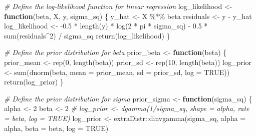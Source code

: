 \documentclass[
  letterpaper,
]{krantz}
\newenvironment{Shaded}{}{}
\newcommand{\AttributeTok}[1]{\textcolor[rgb]{0.49,0.56,0.16}{#1}}
\newcommand{\CommentTok}[1]{\textcolor[rgb]{0.38,0.63,0.69}{\textit{#1}}}
\newcommand{\ConstantTok}[1]{\textcolor[rgb]{0.53,0.00,0.00}{#1}}
\newcommand{\ControlFlowTok}[1]{\textcolor[rgb]{0.00,0.44,0.13}{\textbf{#1}}}
\newcommand{\DecValTok}[1]{\textcolor[rgb]{0.25,0.63,0.44}{#1}}
\newcommand{\FloatTok}[1]{\textcolor[rgb]{0.25,0.63,0.44}{#1}}
\newcommand{\FunctionTok}[1]{\textcolor[rgb]{0.02,0.16,0.49}{#1}}
\newcommand{\NormalTok}[1]{#1}
\newcommand{\OtherTok}[1]{\textcolor[rgb]{0.00,0.44,0.13}{#1}}
\newcommand{\SpecialCharTok}[1]{\textcolor[rgb]{0.25,0.44,0.63}{#1}}
\begin{document}
\begin{Shaded}
\begin{Highlighting}[]
\CommentTok{\# Define the log{-}likelihood function for linear regression}
\NormalTok{log\_likelihood }\OtherTok{\textless{}{-}} \ControlFlowTok{function}\NormalTok{(beta, X, y, sigma\_sq) \{}
\NormalTok{    y\_hat }\OtherTok{\textless{}{-}}\NormalTok{ X }\SpecialCharTok{\%*\%}\NormalTok{ beta}
\NormalTok{    residuals }\OtherTok{\textless{}{-}}\NormalTok{ y }\SpecialCharTok{{-}}\NormalTok{ y\_hat}
\NormalTok{    log\_likelihood }\OtherTok{\textless{}{-}} \SpecialCharTok{{-}}\FloatTok{0.5} \SpecialCharTok{*} \FunctionTok{length}\NormalTok{(y) }\SpecialCharTok{*} \FunctionTok{log}\NormalTok{(}\DecValTok{2} \SpecialCharTok{*}\NormalTok{ pi }\SpecialCharTok{*}\NormalTok{ sigma\_sq) }\SpecialCharTok{{-}} \FloatTok{0.5} \SpecialCharTok{*} \FunctionTok{sum}\NormalTok{(residuals}\SpecialCharTok{\^{}}\DecValTok{2}\NormalTok{) }\SpecialCharTok{/}\NormalTok{ sigma\_sq}
    \FunctionTok{return}\NormalTok{(log\_likelihood)}
\NormalTok{\}}

\CommentTok{\# Define the prior distribution for beta}
\NormalTok{prior\_beta }\OtherTok{\textless{}{-}} \ControlFlowTok{function}\NormalTok{(beta) \{}
\NormalTok{    prior\_mean }\OtherTok{\textless{}{-}} \FunctionTok{rep}\NormalTok{(}\DecValTok{0}\NormalTok{, }\FunctionTok{length}\NormalTok{(beta))}
\NormalTok{    prior\_sd }\OtherTok{\textless{}{-}} \FunctionTok{rep}\NormalTok{(}\DecValTok{10}\NormalTok{, }\FunctionTok{length}\NormalTok{(beta))}
\NormalTok{    log\_prior }\OtherTok{\textless{}{-}} \FunctionTok{sum}\NormalTok{(}\FunctionTok{dnorm}\NormalTok{(beta, }\AttributeTok{mean =}\NormalTok{ prior\_mean, }\AttributeTok{sd =}\NormalTok{ prior\_sd, }\AttributeTok{log =} \ConstantTok{TRUE}\NormalTok{))}
    \FunctionTok{return}\NormalTok{(log\_prior)}
\NormalTok{\}}

\CommentTok{\# Define the prior distribution for sigma}
\NormalTok{prior\_sigma }\OtherTok{\textless{}{-}} \ControlFlowTok{function}\NormalTok{(sigma\_sq) \{}
\NormalTok{    alpha }\OtherTok{\textless{}{-}} \DecValTok{2}
\NormalTok{    beta }\OtherTok{\textless{}{-}} \DecValTok{2}
    \CommentTok{\# log\_prior \textless{}{-} dgamma(1/sigma\_sq, shape = alpha, rate = beta, log = TRUE)}
\NormalTok{    log\_prior }\OtherTok{\textless{}{-}}\NormalTok{ extraDistr}\SpecialCharTok{::}\FunctionTok{dinvgamma}\NormalTok{(sigma\_sq, }\AttributeTok{alpha =}\NormalTok{ alpha, }\AttributeTok{beta =}\NormalTok{ beta, }\AttributeTok{log =} \ConstantTok{TRUE}\NormalTok{) }


\end{Highlighting}
\end{Shaded}
\end{document}
